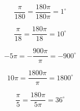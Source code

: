 \documentclass[12pt, a4paper]{article}
\begin{document}
\begin{equation}
	\tag{f}
	\frac{\pi}{180} = \frac{180\pi}{180\pi} = 1^\circ
\end{equation}

\begin{equation}
	\tag{g}
	\frac{\pi}{18} = \frac{180\pi}{18} = 10^\circ
\end{equation}

\begin{equation}
	\tag{h}
	-5\pi = -\frac{900\pi}{\pi} = -900^\circ
\end{equation}

\begin{equation}
	\tag{i}
	10\pi = \frac{1800\pi}{\pi} = 1800^\circ
\end{equation}

\begin{equation}
	\tag{j}
	\frac{\pi}{5} = \frac{180\pi}{5\pi} = 36^\circ 
\end{equation}
\end{document}
